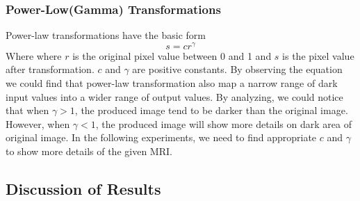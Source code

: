 \subsubsection{Power-Low(Gamma) Transformations}
Power-law transformations have the basic form
$$ s = cr^{\gamma} $$
Where where $r$ is the original pixel value between 0 and 1 and $s$ is the pixel value after transformation. $c$ and $ \gamma $ are positive constants. By observing the equation we could find that power-law transformation also map a narrow range of dark input values into a wider range of output values. By analyzing, we could notice that when $\gamma > 1$, the produced image tend to be darker than the original image. However, when $\gamma < 1$, the produced image will show more details on dark area of original image. In the following experiments, we need to find appropriate $c$ and $\gamma$ to show more details of the given MRI.
\subsection{Discussion of Results}
